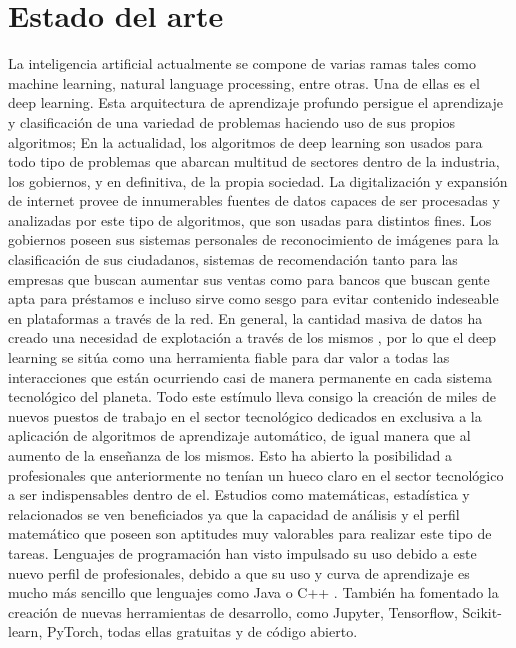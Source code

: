 \section{Estado del arte}\label{sec:estado-del-arte}
La inteligencia artificial actualmente se compone de varias ramas tales como machine learning, natural language processing, entre otras.
Una de ellas es el deep learning.
Esta arquitectura de aprendizaje profundo persigue el aprendizaje y clasificación de una variedad de problemas
haciendo uso de sus propios algoritmos;
En la actualidad, los algoritmos de deep learning son usados para todo tipo de problemas que abarcan multitud de sectores dentro de la industria, los gobiernos, y en definitiva, de la propia sociedad.
La digitalización y expansión de internet provee de innumerables fuentes de datos capaces de ser procesadas y analizadas por este tipo de algoritmos, que son usadas para distintos fines.
Los gobiernos poseen sus sistemas personales de reconocimiento de imágenes para la clasificación de sus ciudadanos, sistemas de recomendación tanto para las empresas que buscan aumentar sus ventas como para bancos que buscan gente apta para préstamos e
incluso sirve como sesgo para evitar contenido indeseable en plataformas a través de la red.
En general, la cantidad masiva de datos ha creado una necesidad de explotación a
través de los mismos , por lo que el deep learning se sitúa como una herramienta fiable para dar valor a todas las interacciones que están ocurriendo casi de manera permanente
en cada sistema tecnológico del planeta.
Todo este estímulo lleva consigo la creación de miles de nuevos puestos de trabajo en el sector tecnológico dedicados en exclusiva a la aplicación de algoritmos de aprendizaje automático, de igual manera que al aumento de la enseñanza de los mismos.
Esto ha abierto la posibilidad a profesionales que anteriormente no tenían un hueco claro en el sector tecnológico a ser indispensables dentro de el.
Estudios como matemáticas, estadística y relacionados
se ven beneficiados ya que la capacidad de análisis y el perfil matemático que poseen son aptitudes muy valorables para realizar este tipo de tareas.
Lenguajes de programación han visto impulsado su uso debido a este nuevo perfil de profesionales, debido a que su uso y curva de aprendizaje es mucho más sencillo que lenguajes como Java o C++ .
También ha fomentado la creación de nuevas herramientas de desarrollo, como Jupyter, Tensorflow, Scikit-learn, PyTorch, todas ellas gratuitas y de código abierto.

